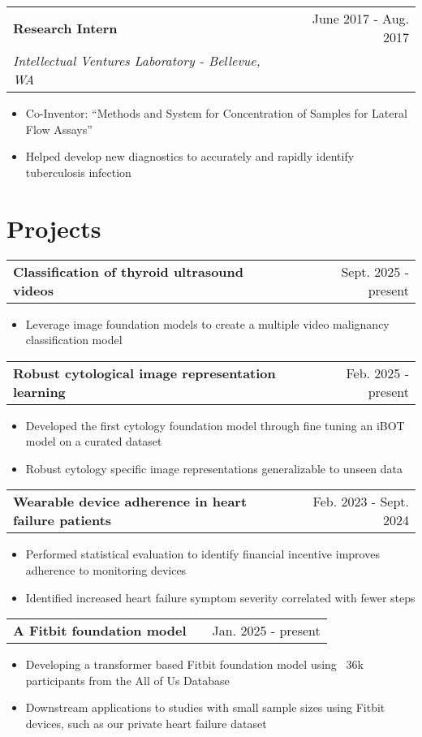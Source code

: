 \documentclass[a4paper,12pt]{article}
\makeatletter
\newenvironment{joblong}[3]
    {
    \begin{tabularx}{\linewidth}{@{}l X r@{}}
    \textbf{#1} & \hfill &  #2 \\
    \textit{#3} & & \\[3.75pt]  
    \end{tabularx}
    \begin{minipage}[t]{\linewidth}
    \begin{itemize}[nosep,after=\strut, leftmargin=1em, itemsep=3pt,label=\scriptsize$\bullet$]
    }
    {
    \end{itemize}
    \end{minipage}    
    }
\newenvironment{projectlong}[2]
    {
    \begin{tabularx}{\linewidth}{@{}l X r@{}}
    \textbf{#1} & \hfill &  #2 \\
    \end{tabularx}
    \begin{minipage}[t]{\linewidth}
    \begin{itemize}[nosep,after=\strut, leftmargin=1em, itemsep=3pt,label=\scriptsize$\bullet$]
    }
    {
    \end{itemize}
    \end{minipage}    
    }
\makeatother
\begin{document}
\begin{joblong}{Research Intern}{June 2017 - Aug. 2017}{Intellectual Ventures Laboratory - Bellevue, WA}
\item Co-Inventor: “Methods and System for Concentration of Samples for Lateral Flow Assays”
\item Helped develop new diagnostics to accurately and rapidly identify tuberculosis infection
\end{joblong}



\section{Projects}

\begin{projectlong}{Classification of thyroid ultrasound videos}{Sept. 2025 - present}
    \item Leverage image foundation models to create a multiple video malignancy classification model
\end{projectlong}

\begin{projectlong}{Robust cytological image representation learning}{Feb. 2025 - present}
    \item Developed the first cytology foundation model through fine tuning an iBOT model on a curated dataset
    \item Robust cytology specific image representations generalizable to unseen data
\end{projectlong}

\begin{projectlong}{Wearable device adherence in heart failure patients}{Feb. 2023 - Sept. 2024}
    \item Performed statistical evaluation to identify financial incentive improves adherence to monitoring devices
    \item Identified increased heart failure symptom severity correlated with fewer steps
\end{projectlong}

\begin{projectlong}{A Fitbit foundation model}{Jan. 2025 - present}
    \item Developing a transformer based Fitbit foundation model using ~36k participants from the All of Us Database
    \item Downstream applications to studies with small sample sizes using Fitbit devices, such as our private heart failure dataset
\end{projectlong}
\end{document}
